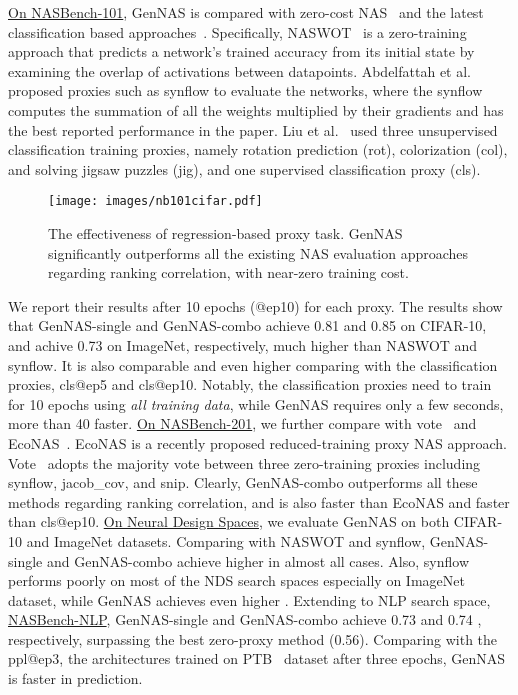 \documentclass{article}
\begin{document}
\underline{On NASBench-101},
GenNAS is compared with zero-cost NAS~\cite{abdelfattah2021zero, mellor2020neural} and the latest classification based approaches~\cite{liu2020labels}.
Specifically, NASWOT~\cite{mellor2020neural} is a zero-training approach that predicts a network's trained accuracy from its initial state by examining the overlap of activations between datapoints.
Abdelfattah et al.~\cite{abdelfattah2021zero} proposed proxies such as synflow to evaluate the networks, where the synflow computes the summation of all the weights multiplied by their gradients and has the best reported performance in the paper.
Liu et al.~\cite{liu2020labels} used three unsupervised classification training proxies, namely rotation prediction (rot), colorization (col), and solving jigsaw puzzles (jig), and one supervised classification proxy (cls).
\begin{wrapfigure}{h}{0.5\textwidth}
  \vspace{-12pt}
  \begin{center}
\texttt{[image: images/nb101cifar.pdf]}
  \end{center}
  \vspace{-5pt}

  \caption{The effectiveness of regression-based proxy task. GenNAS significantly outperforms all the existing NAS evaluation approaches regarding ranking correlation, with near-zero training cost.}
  \label{fig:regression-visulization}
\end{wrapfigure}
We report their results after 10 epochs (@ep10) for each proxy.
The results show that GenNAS-single and GenNAS-combo achieve 0.81 and 0.85  on CIFAR-10, and achive 0.73 on ImageNet, respectively, much higher than NASWOT and synflow. It is also comparable and even higher comparing with the classification proxies, cls@ep5 and cls@ep10.
Notably, the classification proxies need to train for 10 epochs using \textit{all training data}, while GenNAS requires only a few seconds, more than 40 faster. 
\underline{On NASBench-201}, we further compare with vote~\cite{abdelfattah2021zero} and EcoNAS~\cite{zhou2020econas}.
EcoNAS is a recently proposed reduced-training proxy NAS approach.
Vote~\cite{abdelfattah2021zero} adopts the majority vote between three zero-training proxies including synflow, jacob\_cov, and snip.
Clearly, GenNAS-combo outperforms all these methods regarding ranking correlation, and is also  faster than EcoNAS and  faster than cls@ep10.
\underline{On Neural Design Spaces}, we evaluate GenNAS on both CIFAR-10 and ImageNet datasets. 
Comparing with NASWOT and synflow, GenNAS-single and GenNAS-combo achieve higher  in almost all cases. 
Also, synflow performs poorly on most of the NDS search spaces especially on ImageNet dataset, while GenNAS achieves even higher .
Extending to NLP search space, \underline{NASBench-NLP}, GenNAS-single and GenNAS-combo achieve 0.73 and 0.74 , respectively, surpassing the best zero-proxy method (0.56). Comparing with the ppl@ep3, the architectures trained on PTB~\cite{marcus1993building} dataset after three epochs, GenNAS is  faster in prediction.
\end{document}
